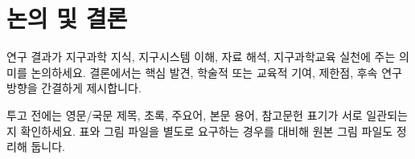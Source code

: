 \section{논의 및 결론}

연구 결과가 지구과학 지식, 지구시스템 이해, 자료 해석, 지구과학교육 실천에 주는 의미를 논의하세요. 결론에서는 핵심 발견, 학술적 또는 교육적 기여, 제한점, 후속 연구 방향을 간결하게 제시합니다.

투고 전에는 영문/국문 제목, 초록, 주요어, 본문 용어, 참고문헌 표기가 서로 일관되는지 확인하세요. 표와 그림 파일을 별도로 요구하는 경우를 대비해 원본 그림 파일도 정리해 둡니다.
